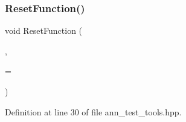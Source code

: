 \subsubsection{Reset\+Function()\hspace{0.1cm}{\footnotesize\ttfamily [2/2]}}
{\footnotesize\ttfamily void Reset\+Function (\begin{DoxyParamCaption}\item[{T \&}]{,  }\item[{typename std\+::enable\+\_\+if$<$!Has\+Reset\+Check$<$ T, void(T\+::$\ast$)()$>$\+::value $>$\+::type $\ast$}]{ = {} }\end{DoxyParamCaption})}



Definition at line 30 of file ann\+\_\+test\+\_\+tools.\+hpp.

